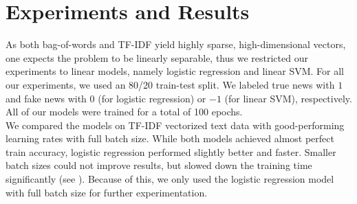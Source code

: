 \documentclass[10pt]{article}
\begin{document}
	
	\section{Experiments and Results}
	As both bag-of-words and TF-IDF yield highly sparse, high-dimensional vectors, one expects the problem to be linearly separable, thus we restricted our experiments to linear models, namely logistic regression and linear SVM. For all our experiments, we used an 80/20 train-test split. We labeled true news with $1$ and fake news with $0$ (for logistic regression) or $-1$ (for linear SVM), respectively. All of our models were trained for a total of 100 epochs. \\
	\indent
	We compared the models on TF-IDF vectorized text data with good-performing learning rates with full batch size. While both models achieved almost perfect train accuracy, logistic regression performed slightly better and faster. Smaller batch sizes could not improve results, but slowed down the training time significantly (see ). Because of this, we only used the logistic regression model with full batch size for further experimentation. 
	
	
\end{document}
